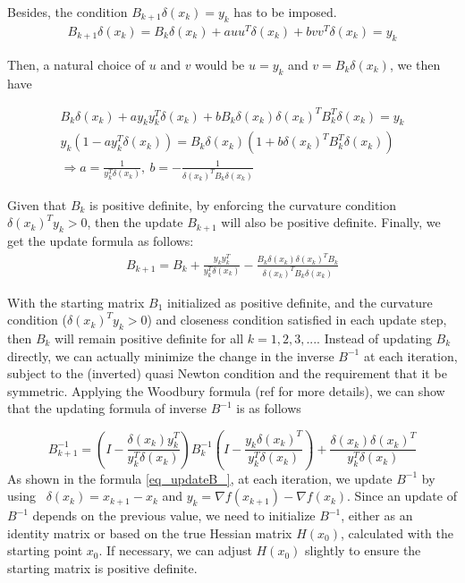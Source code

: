 \documentclass  [
  paper    = a4,
  BCOR     = 10mm,
  twoside,
  fontsize = 12pt,
  fleqn,
  toc      = bibnumbered,
  toc      = listofnumbered,
  numbers  = noendperiod,
  headings = normal,
  listof   = leveldown,
  version  = 3.03
]                                       {scrreprt}
\newcommand{\<}{\langle}
\renewcommand{\>}{\rangle}
\begin{document}
Besides, the condition $B_{k+1}\delta(x_k) = y_k$ has to be imposed.
\begin{align*}
	B_{k+1}\delta(x_k) = B_k\delta(x_k)  + a u u^T\delta(x_k) + b v v^T\delta(x_k) = y_k
\end{align*}

Then, a natural choice of $u$ and $v$ would be $u=y_k$ and $v=B_k\delta(x_k)$, we then have

\begin{align*}
	B_k\delta(x_k) + a y_ky^T_k\delta(x_k) + bB_k\delta(x_k) \delta(x_k)^TB_k^T\delta(x_k) = y_k  \\
	y_k(1-ay_k^T\delta(x_k) ) = B_k\delta(x_k)(1+ b \delta(x_k)^TB_k^T\delta(x_k)) \\
	\Rightarrow a = \frac{1}{y_k^T\delta(x_k)}, \  b= - \frac{1}{\delta(x_k)^TB_k\delta(x_k)}
\end{align*}

Given that $B_k$ is  positive definite, by enforcing the curvature condition $\delta(x_k)^Ty_k >0$, then the update $B_{k+1}$ will also be positive definite.  Finally, we get the update formula as follows: 
\begin{align*}
	B_{k+1} = B_k +  \frac{y_ky_k^T}{y_k^T\delta(x_k)}  - \frac{B_k\delta(x_k)\delta(x_k)^TB_k}{\delta(x_k)^TB_k\delta(x_k)}
\end{align*}

With the starting matrix $B_1$ initialized as positive definite, and the curvature condition ($\delta(x_k)^Ty_k >0$) and closeness condition satisfied in each update step, then $B_k$ will remain positive definite for all $k = 1,2, 3, ...$. Instead of updating $B_k$ directly, we can actually minimize the change in the inverse $B^{-1}$ at each iteration, subject to the (inverted) quasi Newton condition and the requirement that it be symmetric. Applying the Woodbury formula (ref \cite{Wood50} for more details), we can show that the updating formula of inverse $B^{-1}$ is as follows

\begin{equation}
	B_{k+1}^{-1} = (I - \frac{\delta(x_k)y_k^T}{y_k^T\delta(x_k)})B_k^{-1}(I - \frac{y_k\delta(x_k)^T}{y_k^T\delta(x_k)}) +  \frac{\delta(x_k)\delta(x_k)^T}{y_k^T\delta(x_k)} 
	\label{eq_updateB_}
\end{equation}
As shown in the formula \ref{eq_updateB_}, at each iteration, we update $B^{-1}$ by using  $\delta(x_k) = x_{k+1} -x_k$ and $y_k = \nabla f(x_{k+1}) - \nabla f(x_k)$. Since an update of $B^{-1}$ depends on the previous value, we need to initialize $B^{-1}$, either as an identity matrix or based on the true Hessian matrix $H(x_0)$, calculated with the starting point $x_0$. If necessary, we can adjust $H(x_0)$ slightly to ensure the starting matrix is positive definite.
\end{document}
